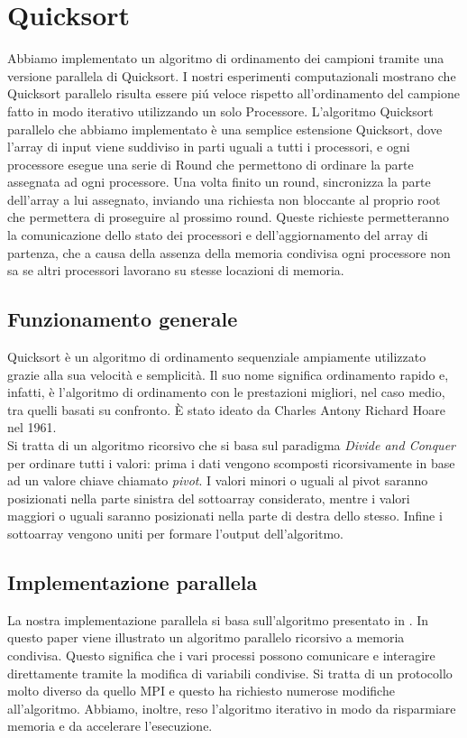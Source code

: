 \chapter{Quicksort}
Abbiamo implementato un algoritmo di ordinamento dei campioni tramite una versione parallela di Quicksort.
I nostri esperimenti computazionali mostrano che Quicksort parallelo risulta essere piú veloce rispetto all'ordinamento del campione fatto in modo iterativo utilizzando un solo  Processore.
L'algoritmo Quicksort parallelo che abbiamo implementato è una semplice estensione Quicksort, dove l'array di input viene suddiviso in parti uguali a tutti i processori, e ogni processore esegue una serie di Round che permettono di ordinare la parte assegnata ad ogni processore.
Una volta finito un round, sincronizza la parte dell'array a lui assegnato, inviando una richiesta non bloccante al proprio root che permettera di proseguire al prossimo round. Queste richieste permetteranno la comunicazione dello stato dei processori e dell'aggiornamento del array di partenza, che a causa della assenza della memoria condivisa ogni processore non sa se altri processori lavorano su stesse locazioni di memoria.

\section{Funzionamento generale}
Quicksort è un algoritmo di ordinamento sequenziale ampiamente utilizzato grazie alla sua velocità e semplicità. Il suo nome significa ordinamento rapido e, infatti, è l'algoritmo di ordinamento con le prestazioni migliori, nel caso medio, tra quelli basati su confronto. È stato ideato da Charles Antony Richard Hoare nel 1961.\\ 
Si tratta di un algoritmo ricorsivo che si basa sul paradigma \textit{Divide and Conquer} per ordinare tutti i valori: prima i dati vengono scomposti ricorsivamente in base ad un valore chiave chiamato \textit{pivot}. I valori minori o uguali al pivot saranno posizionati nella parte sinistra del sottoarray considerato, mentre i valori maggiori o uguali saranno posizionati nella parte di destra dello stesso. Infine i sottoarray vengono uniti per formare l'output dell'algoritmo. \\

\section{Implementazione parallela}
La nostra implementazione parallela si basa sull'algoritmo presentato in \cite{PaperQuickSort}. In questo paper viene illustrato un algoritmo parallelo ricorsivo a memoria condivisa. Questo significa che i vari processi possono comunicare e interagire direttamente tramite la modifica di variabili condivise. Si tratta di un protocollo molto diverso da quello MPI e questo ha richiesto numerose modifiche all'algoritmo. Abbiamo, inoltre, reso l'algoritmo iterativo in modo da risparmiare memoria e da accelerare l'esecuzione.

